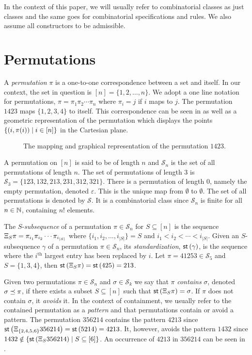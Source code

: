 In the context of this paper, we will usually refer to combinatorial classes as just classes and the same goes for combinatorial specifications and rules. We also assume all constructors to be admissible.

\section{Permutations\label{sec:permutations}}
A \emph{permutation} $\pi$ is a one-to-one correspondence between a set and itself. In our context, the set in question is $[n] = \{1,2,\dotsc,n\}$. We adopt a one line notation for permutations, $\pi = \pi_1 \pi_2 \dotsm \pi_n$ where $\pi_i = j$ if $i$ maps to $j$. The permutation $1423$ maps $\{1,2,3,4\}$ to itself. This correspondence can be seen in  as well as a geometric representation of the permutation which displays the points $\left\{(i,\pi(i)) \mid i \in [n]\right\}$ in the Cartesian plane.

\begin{figure}[ht!]
    \centering
    
    \caption{The mapping and graphical representation of the permutation $1423$.}
    \label{fig:perm_example}
\end{figure}

A permutation on $[n]$ is said to be of length $n$ and $\mathcal{S}_n$ is the set of all permutations of length $n$. The set of permutations of length 3 is $\mathcal{S}_3 = \{123,132,213,231,312,321\}$. There is a permutation of length $0$, namely the empty permutation, denoted $\varepsilon$. This is the unique map from $\emptyset$ to $\emptyset$. The set of all permutations is denoted by $\mathcal{S}$. It is a combinatorial class since $\mathcal{S}_n$ is finite for all $n\in\mathbb{N}$, containing $n!$ elements.

The $S$-\emph{subsequence} of a permutation $\pi \in \mathcal{S}_n$ for $S\subseteq [n]$ is the sequence $\Xi_{S}\pi=\pi_{i_1}\pi_{i_2}\dotsb \pi_{i_{|S|}}$  where $\{i_1,i_2,\dotsc,i_{|S|}\} = S$ and $i_1 < i_2 < \dotsb < i_{|S|}$. Given an $S$-subsequence $\gamma$ of a permutation $\pi \in \mathcal{S}_n$, its \emph{standardization}, $\textsf{st}\left(\gamma\right)$, is the sequence where the $i^\text{th}$ largest entry has been replaced by $i$. Let $\pi = 41253 \in \mathcal{S}_5$ and $S=\{1,3,4\}$, then $\textsf{st}\left(\Xi_{S}\pi\right) = \textsf{st}\left(425\right) = 213$.

Given two permutations $\pi \in \mathcal{S}_n$ and $\sigma \in \mathcal{S}_k$ we say that $\pi$ \emph{contains} $\sigma$, denoted $\sigma \preceq \pi$, if there exists a subset $S \subseteq [n]$ such that $\textsf{st}\left(\Xi_{S}\pi\right) = \sigma$. If $\pi$ does not contain $\sigma$, it \emph{avoids} it. In the context of containment, we usually refer to the contained permutation as a \emph{pattern} and that permutations contain or avoid a pattern. The permutation $356214$ contains the pattern $4213$ since $\textsf{st}\left(\Xi_{\{2, 4, 5, 6\}}356214\right) = \textsf{st}\left(5214\right) = 4213$. It, however, avoids the pattern $1432$ since $1432 \notin \left\{\textsf{st}\left(\Xi_{S}356214\right) \mid S \subseteq [6]\right\}$. An occurrence of $4213$ in $356214$ can be seen in .

